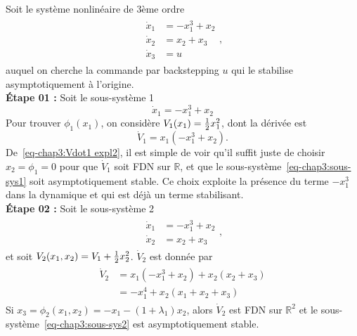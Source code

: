 \begin{example}
	Soit le système nonlinéaire de 3ème ordre 
	\begin{align}\label{eq-chap3:exemple 3rd order sys}
		\begin{split}
			\dot{x}_1&= -x_1^3 + x_2 \\
			\dot{x}_2&= x_2 + x_3\\
			\dot{x}_3&= u 
		\end{split},
	\end{align}
	auquel on cherche la commande par backstepping $u$ qui le stabilise asymptotiquement à l'origine.\\
	\textbf{Étape 01 :} Soit le sous-système 1 
	\begin{equation}\label{eq-chap3:sous-sys1}
		\dot{x}_1= -x_1^3 + x_2
	\end{equation}
		Pour trouver $\phi_1(x_1)$, on considère $V_1(x_1)= \frac{1}{2} x_1^2$, dont la dérivée est 
		\begin{equation}\label{eq-chap3:Vdot1 expl2}
			\dot{V}_1 = x_1\left(-x_1^3 + x_2\right).
		\end{equation}
   De~\eqref{eq-chap3:Vdot1 expl2}, il est simple de voir qu'il suffit juste de choisir $x_2 = \phi_1=0$ pour que $\dot{V}_1$ soit FDN sur $\mathbb{R}$, et que le sous-système~\eqref{eq-chap3:sous-sys1} soit asymptotiquement stable. Ce choix exploite la présence du terme $-x_1^3$ dans la dynamique et qui est déjà un terme stabilisant. \\
   \textbf{Étape 02 :} Soit le sous-système 2 
   \begin{align}\label{eq-chap3:sous-sys2}
   	\begin{split}
   		\dot{x}_1&= -x_1^3 + x_2 \\
   		\dot{x}_2&= x_2 + x_3
   	\end{split},
   \end{align}
   et soit $V_2(x_1,x_2) = V_1 + \frac{1}{2} x_2^2$. $\dot{V}_2$ est donnée par 
   \begin{align}
   	\begin{split}
   		\dot{V}_2 &=x_1\left(-x_1^3 + x_2\right) + x_2\left(x_2 + x_3\right)\\
   		&=-x_1^4 + x_2\left(x_1 +x_2 + x_3\right)
   	\end{split}
   \end{align}
   Si $x_3=\phi_2(x_1,x_2) = -x_1-(1+\lambda_1)x_2$, alors $\dot{V}_2$ est FDN sur $\mathbb{R}^2$ et le sous-système~\eqref{eq-chap3:sous-sys2} est asymptotiquement stable.\\

\end{example}

